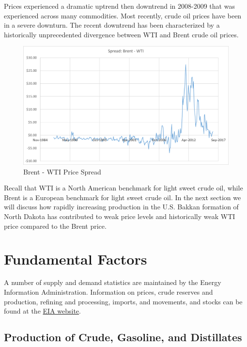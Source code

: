 \documentclass[]{book}
\theoremstyle{definition}
\theoremstyle{definition}
\theoremstyle{remark}
\begin{document}
Prices experienced a dramatic uptrend then downtrend in 2008-2009 that
was experienced across many commodities. Most recently, crude oil prices
have been in a severe downturn. The recent downtrend has been
characterized by a historically unprecedented divergence between WTI and
Brent crude oil prices.

\begin{figure}[htbp]
\centering
\includegraphics{Excel-files/CrudeOiland-crudeoil_files/image008.png}
\caption{Brent - WTI Price Spread}
\end{figure}

Recall that WTI is a North American benchmark for light sweet crude oil,
while Brent is a European benchmark for light sweet crude oil. In the
next section we will discuss how rapidly increasing production in the
U.S. Bakkan formation of North Dakota has contributed to weak price
levels and historically weak WTI price compared to the Brent price.

\section{Fundamental Factors}\label{fundamental-factors}

A number of supply and demand statistics are maintained by the Energy
Information Administration. Information on prices, crude reserves and
production, refining and processing, imports, and movements, and stocks
can be found at the \href{http://www.eia.gov/petroleum/data.cfm}{EIA
website}.

\subsection{Production of Crude, Gasoline, and
Distillates}\label{production-of-crude-gasoline-and-distillates}
\end{document}
